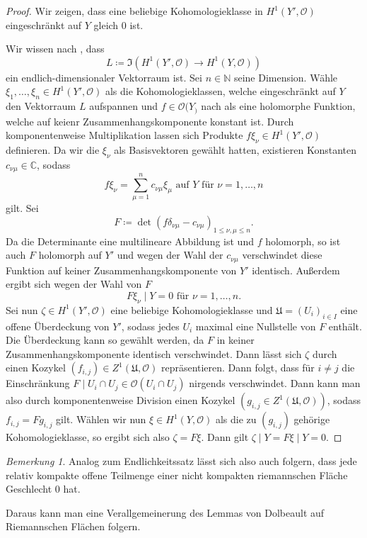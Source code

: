 \documentclass[11pt,a4paper]{scrartcl}
\theoremstyle{thm}
\theoremstyle{def}
\theoremstyle{remark}
\newtheorem*{bem}{Bemerkung}
\begin{document}
\begin{proof}
	Wir zeigen, dass eine beliebige Kohomologieklasse in $H^1(Y',\mathcal{O})$ eingeschränkt auf $Y$ gleich $0$ ist.
	
	Wir wissen nach , dass 
	\[L\coloneqq \Im\left(H^1(Y',\mathcal{O})\rightarrow H^1(Y,\mathcal{O})\right)\]
	ein endlich-dimensionaler Vektorraum ist. Sei $n\in\mathbb{N}$ seine Dimension. Wähle $\xi_1,\ldots,\xi_n\in H^1(Y',\mathcal{O})$ als die Kohomologieklassen, welche eingeschränkt auf $Y$ den Vektorraum $L$ aufspannen und $f\in\mathcal{O}(Y_)$ nach  als eine holomorphe Funktion, welche auf keienr Zusammenhangskomponente konstant ist. Durch komponentenweise Multiplikation lassen sich Produkte $f\xi_\nu\in H^1(Y',\mathcal{O})$ definieren. Da wir die $\xi_\nu$ als Basisvektoren gewählt hatten, existieren Konstanten $c_{\nu\mu}\in\mathbb{C}$, sodass
	\[f\xi_\nu =\sum_{\mu=1}^n c_{\nu\mu}\xi_\mu \text{ auf } Y\text{ für } \nu=1,\ldots,n\]
	gilt. Sei
	\[
	F\coloneqq \det (f\delta_{\nu\mu}-c_{\nu\mu})_{1\leq\nu,\mu\leq n}.
	\]
	Da die Determinante eine multilineare Abbildung ist und $f$ holomorph, so ist auch $F$ holomorph auf $Y'$ und wegen der Wahl der $c_{\nu\mu}$ verschwindet diese Funktion auf keiner Zusammenhangskomponente von $Y'$ identisch. Außerdem ergibt sich wegen der Wahl von $F$
	\[
	F\xi_\nu\mid Y = 0\text{ für } \nu=1,\ldots,n.
	\]
	Sei nun $\zeta\in H^1(Y',\mathcal{O})$ eine beliebige Kohomologieklasse und $\mathfrak{U}=(U_i)_{i\in I}$ eine offene Überdeckung von $Y'$, sodass jedes $U_i$ maximal eine Nullstelle von $F$ enthält. Die Überdeckung kann so gewählt werden, da $F$ in keiner Zusammenhangskomponente identisch verschwindet. Dann lässt sich $\zeta$ durch einen Kozykel $(f_{i,j})\in Z^1(\mathfrak{U},\mathcal{O})$ repräsentieren.
	Dann folgt, dass für $i\neq j$ die Einschränkung $F\mid U_i\cap U_j\in \mathcal{O}(U_i\cap U_j)$ nirgends verschwindet. Dann kann man also durch komponentenweise Division einen Kozykel $(g_{i,j}\in Z^1(\mathfrak{U},\mathcal{O}))$, sodass $f_{i,j}=Fg_{i,j}$ gilt. 
	Wählen wir nun $\xi\in H^1(Y,\mathcal{O})$ als die zu $(g_{i,j})$ gehörige Kohomologieklasse, so ergibt sich also $\zeta =F\xi$. Dann gilt
	$\zeta\mid Y = F\xi\mid Y =0$.
	\end{proof}
\begin{bem}
Analog zum Endlichkeitssatz lässt sich also auch folgern, dass jede relativ kompakte offene Teilmenge einer nicht kompakten riemannschen Fläche Geschlecht 0 hat.
\end{bem}
Daraus kann man eine Verallgemeinerung des Lemmas von Dolbeault auf Riemannschen Flächen\cite[S.97,13.2]{forster} folgern.
\end{document}
